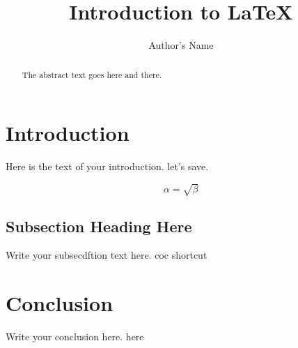 \documentclass{article}
\begin{document}
\title{Introduction to \LaTeX{}}
\author{Author's Name}

\maketitle

\begin{abstract}
The abstract text goes here and there.
\end{abstract}

\section{Introduction}
Here is the text of your introduction. let's save.

\begin{equation}
    \label{simple_equation}
    \alpha = \sqrt{ \beta }
\end{equation}

\subsection{Subsection Heading Here}
Write your subsecdftion text here. coc shortcut


\section{Conclusion}
Write your conclusion here. here
\end{document}

